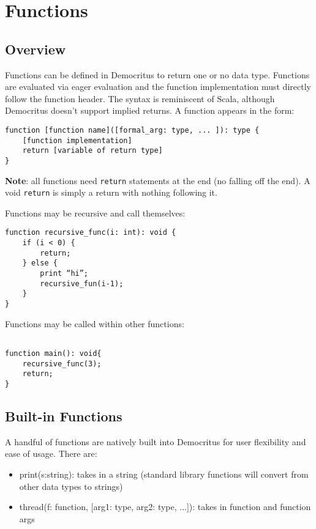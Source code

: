 \chapter{Functions}
    \section{Overview}
        Functions can be defined in Democritus to return one or no data type.  Functions are evaluated via eager evaluation and the function implementation must directly follow the function header. The syntax is reminiscent of Scala, although Democritus doesn't support implied returns.
        \vspace{5mm}
        \noindent A function appears in the form:
        
        \begin{lstlisting}
function [function name]([formal_arg: type, ... ]): type {
    [function implementation]
    return [variable of return type]
}
        \end{lstlisting}

        \noindent \textbf{Note}: all functions need \texttt{return} statements at the end (no falling off the end). A void \texttt{return} is simply a return with nothing following it.

        \vspace{5mm}
        \noindent Functions may be recursive and call themselves:

        \begin{lstlisting}
function recursive_func(i: int): void {
    if (i < 0) {
        return;
    } else {
        print “hi”;
        recursive_fun(i-1);
    }
}
        \end{lstlisting}


        \noindent Functions may be called within other functions:
        \begin{lstlisting}

function main(): void{
    recursive_func(3);
    return;
}
        \end{lstlisting}


    \section{Built-in Functions}
        A handful of functions are natively built into Democritus for user flexibility and ease of usage. There are:
        \begin{itemize}
            \item print(s:string): takes in a string (standard library functions will convert from other data types to strings)
            \item thread(f: function, [arg1: type, arg2: type, ...]): takes in function and function args
        \end{itemize}